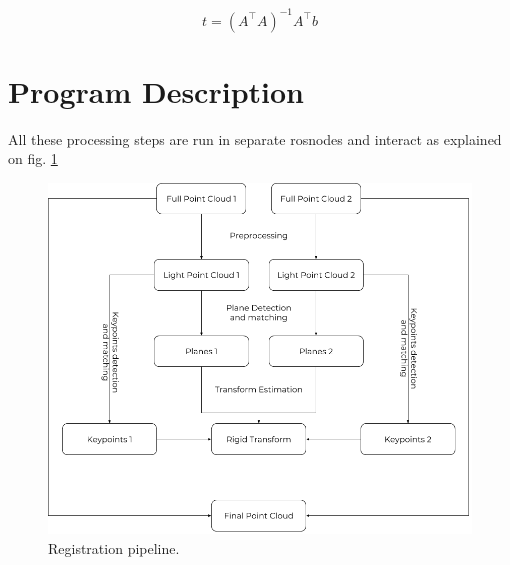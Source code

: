 \[
    t = (A^\top A)^{-1}A^\top b
\]

\section{Program Description}

All these processing steps are run in separate \glspl{rosnode} and interact as explained on fig. \ref{fig:pipeline}

\begin{figure}[h!]
    \centering
    \includegraphics[scale=0.5]{images/pipeline.png}
    \caption{Registration pipeline.}
    \label{fig:pipeline}
\end{figure}
